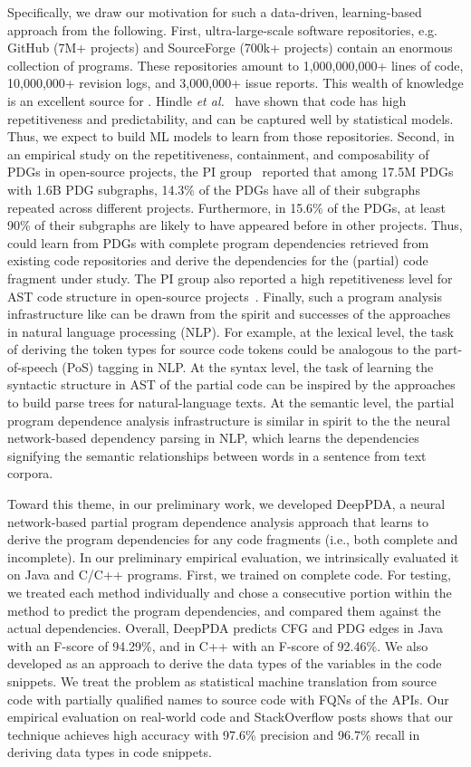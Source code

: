 Specifically, we draw our motivation for such a data-driven,
learning-based approach from the following. First, ultra-large-scale
software repositories, e.g. GitHub (7M+ projects) and SourceForge
(700k+ projects) contain an enormous collection of programs. These
repositories amount to 1,000,000,000+ lines of code, 10,000,000+
revision logs, and 3,000,000+ issue reports. This wealth of knowledge
is an excellent source for {\tool}. Hindle {\em et
  al.}~\cite{naturalness-icse12} have shown that code has high
repetitiveness and predictability, and can be captured well by
statistical models. Thus, we expect to build ML models to learn from
those repositories. Second, in an empirical study on the
repetitiveness, containment, and composability of PDGs in open-source
projects, the PI group~\cite{msr16} reported that among
17.5M PDGs with 1.6B PDG subgraphs, 14.3\% of the PDGs have all of
their subgraphs repeated across different projects. Furthermore, in
15.6\% of the PDGs, at least 90\% of their subgraphs are likely to
have appeared before in other projects. Thus, {\tool} could learn from
PDGs with complete program dependencies retrieved from existing code
repositories and derive the dependencies for the (partial) code
fragment under study. The PI group also reported a high repetitiveness
level for AST code structure in open-source
projects~\cite{icse15}. Finally, such a program analysis
infrastructure like {\tool} can be drawn from the spirit and successes
of the approaches in natural language processing (NLP). For example,
at the lexical level, the task of deriving the token types for source
code tokens could be analogous to the part-of-speech (PoS) tagging in
NLP. At the syntax level, the task of learning the syntactic structure
in AST of the partial code can be inspired by the approaches to build
parse trees for natural-language texts. At the semantic level, the
partial program dependence analysis infrastructure is similar in
spirit to the the neural network-based dependency parsing in NLP,
which learns the dependencies signifying the semantic relationships
between words in a sentence from text corpora.

Toward this theme, in our preliminary work, we developed DeepPDA, a neural
network-based partial program dependence analysis approach that learns
to derive the program dependencies for any code fragments (i.e., both
complete and incomplete). In our preliminary empirical evaluation, we
intrinsically evaluated it on Java and C/C++ programs. First, we
trained {\tool} on complete code. For testing, we treated each method
individually and chose a consecutive portion within the method to
predict the program dependencies, and compared them against the actual
dependencies. Overall, DeepPDA predicts CFG and PDG edges in Java
with an F-score of 94.29\%, and in C++ with an F-score of
92.46\%.
%
We also developed as an approach to derive the data
types of the variables in the code snippets. We treat the problem as
statistical machine translation from source code with partially
qualified names to source code with FQNs of the APIs. Our empirical
evaluation on real-world code and StackOverflow posts shows that our
technique achieves high accuracy with 97.6\% precision and 96.7\%
recall in deriving data types in code snippets.


